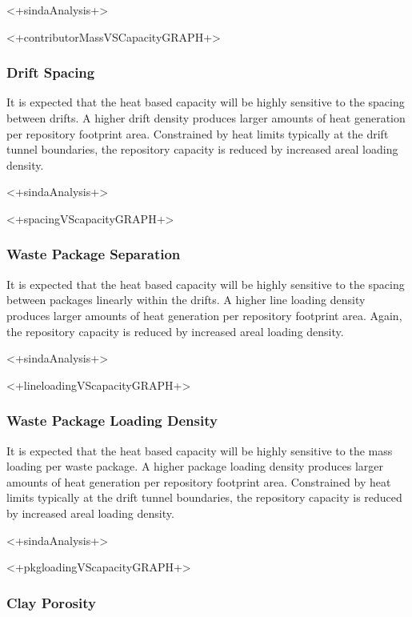 <+sindaAnalysis+>

<+contributorMassVSCapacityGRAPH+>

\subsubsection{Drift Spacing}

It is expected that the heat based capacity will be highly sensitive to the 
spacing between drifts. A higher drift density produces larger amounts of heat 
generation per repository footprint area. Constrained by heat limits typically 
at the drift tunnel boundaries, the repository capacity is reduced by increased 
areal loading density. 

<+sindaAnalysis+>

<+spacingVScapacityGRAPH+>

\subsubsection{Waste Package Separation}

It is expected that the heat based capacity will be highly sensitive to the 
spacing between packages linearly within the drifts. A higher line loading 
density produces larger amounts of heat generation per repository footprint 
area.  Again, the repository capacity is reduced by increased areal loading 
density. 

<+sindaAnalysis+>

<+lineloadingVScapacityGRAPH+>


\subsubsection{Waste Package Loading Density}

It is expected that the heat based capacity will be highly sensitive to the 
mass loading per waste package. A higher package loading density produces larger amounts 
of heat 
generation per repository footprint area. Constrained by heat limits typically 
at the drift tunnel boundaries, the repository capacity is reduced by increased 
areal loading density. 

<+sindaAnalysis+>

<+pkgloadingVScapacityGRAPH+>

\subsubsection{Clay Porosity}

